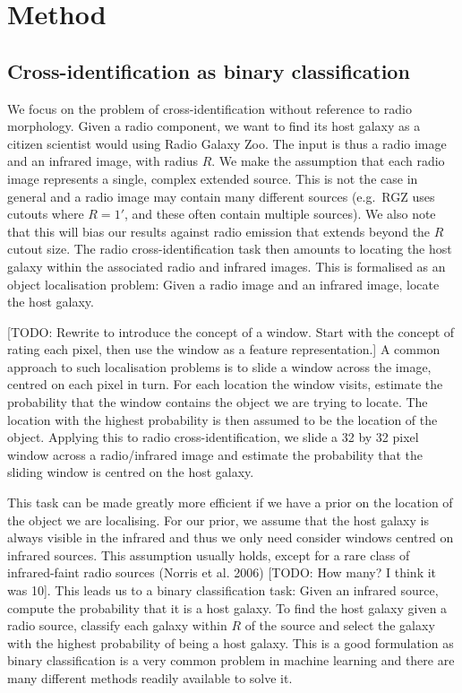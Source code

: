 \documentclass[fleqn,usenatbib,usedcolumn]{mnras}
\begin{document}
  \section{Method}\label{method}

  \subsection{Cross-identification as binary
  classification}\label{cross-identification-as-binary-classification}

    We focus on the problem of cross-identification without reference to
    radio morphology. Given a radio component, we want to find its host
    galaxy as a citizen scientist would using Radio Galaxy Zoo. The input is
    thus a radio image and an infrared image, with radius \(R\). We make the
    assumption that each radio image represents a single, complex extended
    source. This is not the case in general and a radio image may contain
    many different sources (e.g.~RGZ uses cutouts where \(R = 1'\), and
    these often contain multiple sources). We also note that this will bias
    our results against radio emission that extends beyond the \(R\) cutout
    size. The radio cross-identification task then amounts to locating the
    host galaxy within the associated radio and infrared images. This is
    formalised as an object localisation problem: Given a radio image and an
    infrared image, locate the host galaxy.

    {[}TODO: Rewrite to introduce the concept of a window. Start with the
    concept of rating each pixel, then use the window as a feature
    representation.{]} A common approach to such localisation problems is to
    slide a window across the image, centred on each pixel in turn. For each
    location the window visits, estimate the probability that the window
    contains the object we are trying to locate. The location with the
    highest probability is then assumed to be the location of the object.
    Applying this to radio cross-identification, we slide a 32 by 32 pixel
    window across a radio/infrared image and estimate the probability that
    the sliding window is centred on the host galaxy.

    This task can be made greatly more efficient if we have a prior on the
    location of the object we are localising. For our prior, we assume that
    the host galaxy is always visible in the infrared and thus we only need
    consider windows centred on infrared sources. This assumption usually
    holds, except for a rare class of infrared-faint radio sources (Norris
    et al. 2006) {[}TODO: How many? I think it was 10{]}. This leads us to a
    binary classification task: Given an infrared source, compute the
    probability that it is a host galaxy. To find the host galaxy given a
    radio source, classify each galaxy within \(R\) of the source and select
    the galaxy with the highest probability of being a host galaxy. This is
    a good formulation as binary classification is a very common problem in
    machine learning and there are many different methods readily available
    to solve it.
\end{document}
